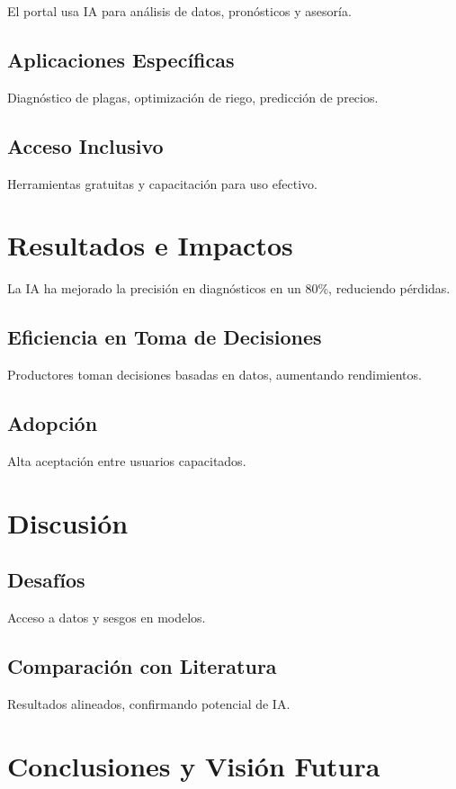 El portal usa IA para análisis de datos, pronósticos y asesoría.

\subsection{Aplicaciones Específicas}
Diagnóstico de plagas, optimización de riego, predicción de precios.

\subsection{Acceso Inclusivo}
Herramientas gratuitas y capacitación para uso efectivo.

\section{Resultados e Impactos}

La IA ha mejorado la precisión en diagnósticos en un 80\%, reduciendo pérdidas.

\subsection{Eficiencia en Toma de Decisiones}
Productores toman decisiones basadas en datos, aumentando rendimientos.

\subsection{Adopción}
Alta aceptación entre usuarios capacitados.

\section{Discusión}

\subsection{Desafíos}
Acceso a datos y sesgos en modelos.

\subsection{Comparación con Literatura}
Resultados alineados, confirmando potencial de IA.

\section{Conclusiones y Visión Futura}

